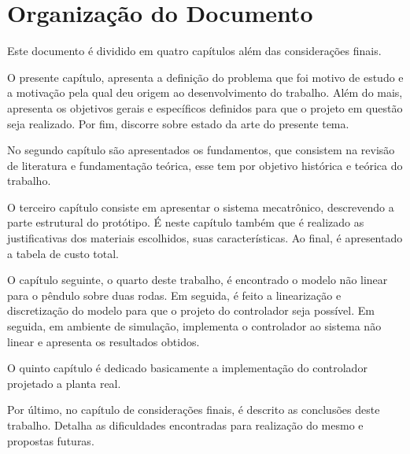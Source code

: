\section{Organização do Documento}

Este documento é dividido em quatro capítulos além das considerações finais. 

O presente capítulo, apresenta a definição do problema que foi motivo de estudo e a motivação pela qual deu origem ao desenvolvimento do trabalho. Além do mais, apresenta os objetivos gerais e específicos definidos para que o projeto em questão seja realizado. Por fim, discorre sobre estado da arte do presente tema.

No segundo capítulo são apresentados os fundamentos, que consistem na revisão de literatura e fundamentação teórica, esse tem por objetivo histórica e teórica do trabalho. 

O terceiro capítulo consiste em apresentar o sistema mecatrônico, descrevendo a parte estrutural do protótipo. É neste capítulo também que é realizado as justificativas dos materiais escolhidos, suas características. Ao final, é apresentado a tabela de custo total.

O capítulo seguinte, o quarto deste trabalho, é encontrado o modelo não linear para o pêndulo sobre duas rodas. Em seguida, é feito a linearização e discretização do modelo para que o projeto do controlador seja possível. Em seguida, em ambiente de simulação, implementa o controlador ao sistema não linear e apresenta os resultados obtidos.

O quinto capítulo é dedicado basicamente a implementação do controlador projetado a planta real.

Por último, no capítulo de considerações finais, é descrito as conclusões deste trabalho. Detalha as dificuldades encontradas para realização do mesmo e propostas futuras.



